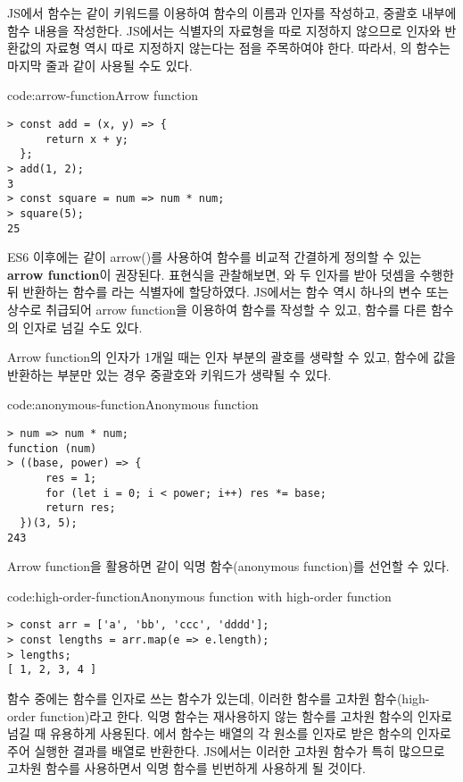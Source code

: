 JS에서 함수는 \과 같이  키워드를 이용하여 함수의 이름과 인자를 작성하고, 중괄호 내부에 함수 내용을 작성한다. JS에서는 식별자의 자료형을 따로 지정하지 않으므로 인자와 반환값의 자료형 역시 따로 지정하지 않는다는 점을 주목하여야 한다. 따라서, 의 함수는 마지막 줄과 같이 사용될 수도 있다.

\begin{codeenv}{code:arrow-function}{Arrow function}\begin{verbatim}
> const add = (x, y) => {
      return x + y;
  };
> add(1, 2);
3
> const square = num => num * num;
> square(5);
25
\end{verbatim}
\end{codeenv}
\clearpage

ES6 이후에는 \과 같이 arrow(\cd{=>})를 사용하여 함수를 비교적 간결하게 정의할 수 있는 \textbf{arrow function}이 권장된다. 표현식을 관찰해보면, 와  두 인자를 받아 덧셈을 수행한 뒤 반환하는 함수를 라는 식별자에 할당하였다. JS에서는 함수 역시 하나의 변수 또는 상수로 취급되어 arrow function을 이용하여 함수를 작성할 수 있고, 함수를 다른 함수의 인자로 넘길 수도 있다.

Arrow function의 인자가 1개일 때는 인자 부분의 괄호를 생략할 수 있고, 함수에 값을 반환하는 부분만 있는 경우 중괄호와  키워드가 생략될 수 있다.

\begin{codeenv}{code:anonymous-function}{Anonymous function}\begin{verbatim}
> num => num * num;
function (num)
> ((base, power) => {
      res = 1;
      for (let i = 0; i < power; i++) res *= base;
      return res;
  })(3, 5);
243
\end{verbatim}
\end{codeenv}

Arrow function을 활용하면 \과 같이 익명 함수(anonymous function)를 선언할 수 있다.

\begin{codeenv}{code:high-order-function}{Anonymous function with high-order function}\begin{verbatim}
> const arr = ['a', 'bb', 'ccc', 'dddd'];
> const lengths = arr.map(e => e.length);
> lengths;
[ 1, 2, 3, 4 ]
\end{verbatim}
\end{codeenv}

함수 중에는 함수를 인자로 쓰는 함수가 있는데, 이러한 함수를 고차원 함수(high-order function)라고 한다. 익명 함수는 재사용하지 않는 함수를 고차원 함수의 인자로 넘길 때 유용하게 사용된다. 에서  함수는 배열의 각 원소를 인자로 받은 함수의 인자로 주어 실행한 결과를 배열로 반환한다. JS에서는 이러한 고차원 함수가 특히 많으므로 고차원 함수를 사용하면서 익명 함수를 빈번하게 사용하게 될 것이다.

